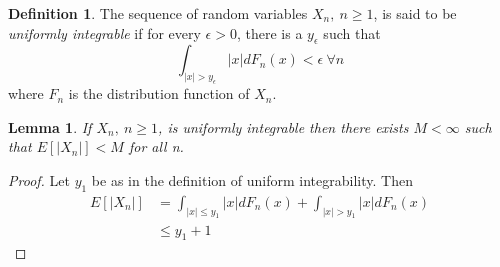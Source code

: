 \documentclass[a4paper,10pt]{article}
\theoremstyle{plain}
\newtheorem{lem}[thm]{Lemma}
\theoremstyle{definition}
\newtheorem{defn}[thm]{Definition}
\theoremstyle{remark}
\begin{document}
\begin{defn}
The sequence of random variables $X_n,~ n\geq 1$, is said to be \textit{uniformly integrable} if for every $\epsilon>0$, there is a $y_\epsilon$ such that
\begin{equation*}
\int_{|x|>y_\epsilon}|x|dF_{n}(x) < \epsilon ~\forall n
\end{equation*}
where $F_n$ is the distribution function of $X_n$.
\end{defn}
\begin{lem}
If $X_n,~ n \geq 1$, is uniformly integrable then there exists $M< \infty$ such that $E[|X_n|]<M$ for all n.
\end{lem}
\begin{proof}
Let $y_1$ be as in the definition of uniform integrability. Then
\begin{eqnarray*}
E[|X_n|]&=\int_{|x|\leq y_1}|x|dF_n(x)+\int_{|x|>y_1}|x|dF_n(x)\\
&\leq y_1+1
\end{eqnarray*}
\end{proof}
\end{document}
